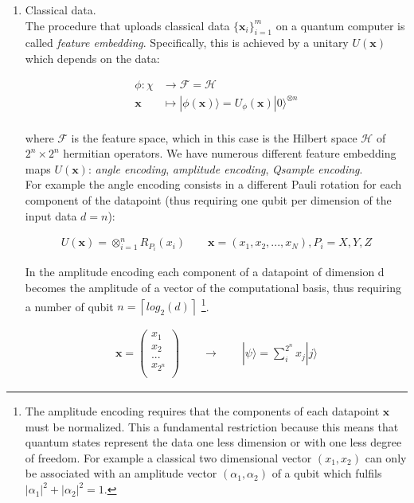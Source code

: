 \begin{enumerate}
    \item Classical data.\\
    The procedure that uploads classical data $\{\bm{x}_i\}_{i=1}^m$ on a quantum computer is called
    \textit{feature embedding}.
    Specifically, this is achieved by a unitary $U(\bm{x})$ which depends on the data:

    \begin{align}
        \phi : \chi &\rightarrow \mathcal{F} = \mathcal{H}\\
        \bm{x} &\mapsto |\phi(\bm{x})\rangle = U_{\phi}(\bm{x}) |0\rangle^{\otimes n}\\
    \end{align}

    where $\mathcal{F}$ is the feature space, which in this case is the Hilbert space $\mathcal{H}$ of 
    $2^n \times 2^n$ hermitian operators.
    We have numerous different feature embedding maps $U(\bm{x})$: \textit{angle encoding}, \textit{amplitude encoding},
    \textit{Qsample encoding}.\\
    For example the angle encoding consists in a different Pauli rotation for each component of the datapoint
    (thus requiring one qubit per dimension of the input data $d = n$):

    \begin{align}
        U(\bm{x}) = \otimes_{i=1}^n R_{P_i}(x_i) 
        \qquad 
        \bm{x} = (x_1, x_2, ..., x_N), P_i = {X, Y, Z}
    \end{align}

    In the amplitude encoding each component of a datapoint of dimension d becomes the amplitude of a vector 
    of the computational basis, thus requiring a number of qubit $n = \left\lceil log_2(d) \right\rceil$
    \footnote[1]{
        The amplitude encoding requires that the components of each datapoint $\bm{x}$ must be normalized. 
        This a fundamental restriction because 
        this means that quantum states represent the data one less dimension or with one less degree of freedom.
        For example a classical two dimensional vector $(x_1, x_2)$ can only be associated with an amplitude 
        vector $(\alpha_1, \alpha_2)$ of a qubit which fulfils $|\alpha_1|^2 + |\alpha_2|^2 = 1$.
    }.

    \begin{align}
    \bm{x} = \begin{pmatrix}
        x_1 \\
        x_2 \\
        ... \\
        x_{2^n} \\
    \end{pmatrix}
    \qquad
    \rightarrow
    \qquad
    |\psi \rangle = \sum_i^{2^n} x_j | j \rangle
    \end{align}


\end{enumerate}
